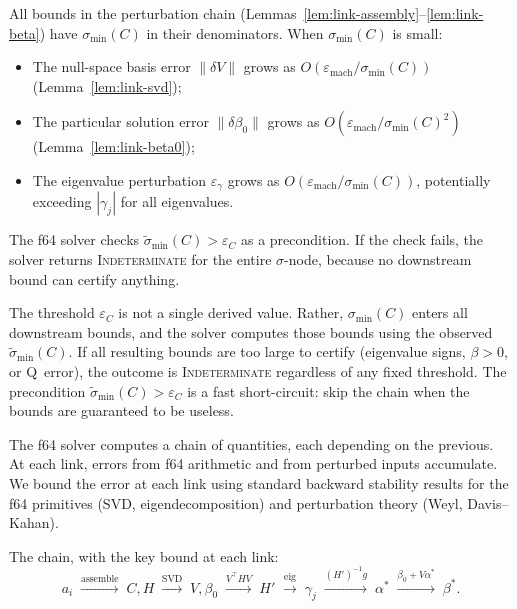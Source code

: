 \begin{remark}\label{rem:conditioning-precondition}
All bounds in the perturbation chain
(Lemmas~\ref{lem:link-assembly}--\ref{lem:link-beta})
have $\sigma_{\min}(C)$ in their denominators.
When $\sigma_{\min}(C)$ is small:
\begin{itemize}
  \item The null-space basis error $\|\delta V\|$ grows as
    $O(\varepsilon_{\mathrm{mach}} / \sigma_{\min}(C))$
    (Lemma~\ref{lem:link-svd});
  \item The particular solution error $\|\delta\beta_0\|$ grows as
    $O(\varepsilon_{\mathrm{mach}} / \sigma_{\min}(C)^2)$
    (Lemma~\ref{lem:link-beta0});
  \item The eigenvalue perturbation $\varepsilon_\gamma$ grows as
    $O(\varepsilon_{\mathrm{mach}} / \sigma_{\min}(C))$,
    potentially exceeding $|\gamma_j|$ for all eigenvalues.
\end{itemize}
The f64 solver checks $\tilde\sigma_{\min}(C) > \varepsilon_C$
as a precondition.
If the check fails, the solver returns \textsc{Indeterminate}
for the entire $\sigma$-node, because no downstream bound
can certify anything.

The threshold $\varepsilon_C$ is not a single derived value.
Rather, $\sigma_{\min}(C)$ enters all downstream bounds, and the
solver computes those bounds using the observed $\tilde\sigma_{\min}(C)$.
If all resulting bounds are too large to certify
(eigenvalue signs, $\beta > 0$, or Q~error), the outcome is
\textsc{Indeterminate} regardless of any fixed threshold.
The precondition $\tilde\sigma_{\min}(C) > \varepsilon_C$ is
a fast short-circuit: skip the chain when the bounds are
guaranteed to be useless.

\end{remark}


\begin{remark}\label{rem:perturbation-chain}
The f64 solver computes a chain of quantities, each depending
on the previous.
At each link, errors from f64 arithmetic and from perturbed
inputs accumulate.
We bound the error at each link using standard backward
stability results for the f64 primitives (SVD, eigendecomposition)
and perturbation theory (Weyl, Davis--Kahan).

The chain, with the key bound at each link:
\[
  a_i
  \;\xrightarrow{\text{assemble}}\;
  C, H
  \;\xrightarrow{\text{SVD}}\;
  V, \beta_0
  \;\xrightarrow{V^\top H V}\;
  H'
  \;\xrightarrow{\text{eig}}\;
  \gamma_j
  \;\xrightarrow{(H')^{-1} g}\;
  \alpha^*
  \;\xrightarrow{\beta_0 + V\alpha^*}\;
  \beta^*.
\]
\end{remark}


